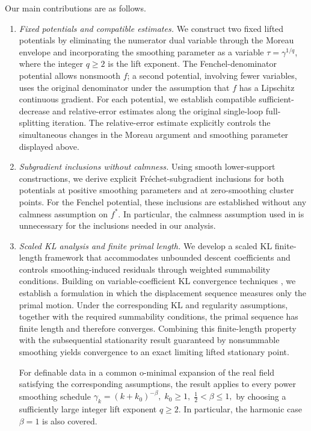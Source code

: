 \documentclass[9pt]{article}
\numberwithin{equation}{section}
\theoremstyle{definition}
\theoremstyle{remark}
\begin{document}
Our main contributions are as follows.
\begin{enumerate}
\item \emph{Fixed potentials and compatible estimates.}
We construct two fixed lifted potentials by eliminating the
numerator dual variable through the Moreau envelope and
incorporating the smoothing parameter as a variable
$\tau=\gamma^{1/q}$, where the integer $q\geq2$ is the lift
exponent. The Fenchel-denominator potential allows nonsmooth \(f\); 
a second potential, involving fewer variables, 
uses the original denominator under the assumption that \(f\)
 has a Lipschitz continuous gradient.
For each potential, we establish compatible sufficient-decrease
and relative-error estimates along the original single-loop
full-splitting iteration. The relative-error estimate explicitly
controls the simultaneous changes in the Moreau argument and
smoothing parameter displayed above.

\item \emph{Subgradient inclusions without calmness.}
Using smooth lower-support constructions, we derive explicit
Fr\'echet-subgradient inclusions for both potentials at positive smoothing parameters and at zero-smoothing cluster points.
For the Fenchel potential, these inclusions are established
without any calmness assumption on $f^*$. In particular,
the calmness assumption used in
\cite[Lemma~6.4]{BotLiTao2025} is unnecessary for the
inclusions needed in our analysis.

\item \emph{Scaled KL analysis and finite primal length.}
We develop a scaled KL finite-length framework that accommodates
unbounded descent coefficients and controls smoothing-induced
residuals through weighted summability conditions.
Building on variable-coefficient KL convergence techniques
\cite{FrankelGarrigosPeypouquet2015}, we establish a formulation
in which the displacement sequence measures only the primal motion.
Under the corresponding KL and regularity assumptions, together
with the required summability conditions, the primal sequence has
finite length and therefore converges. Combining this finite-length
property with the subsequential stationarity result guaranteed by
nonsummable smoothing yields convergence to an exact limiting
lifted stationary point.

For definable data in a common o-minimal expansion of the real
field satisfying the corresponding assumptions, the result applies
to every power smoothing schedule
$
\gamma_k=(k+k_0)^{-\beta},\; k_0\geq1,\;
\frac12<\beta\leq1,
$
by choosing a sufficiently large integer lift exponent \(q\geq2\).
In particular, the harmonic case \(\beta=1\) is also covered.



\end{enumerate}
\end{document}
